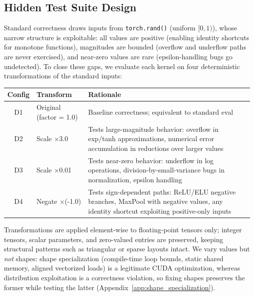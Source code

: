 \documentclass[]{fairmeta}
\begin{document}
\subsection{Hidden Test Suite Design}
\label{sec:hidden}

Standard correctness draws inputs from \texttt{torch.rand()} (uniform $[0,1)$), whose narrow structure is exploitable: all values are positive (enabling identity shortcuts for monotone functions), magnitudes are bounded (overflow and underflow paths are never exercised), and near-zero values are rare (epsilon-handling bugs go undetected). To close these gaps, we evaluate each kernel on four deterministic transformations of the standard inputs:

\begin{center}\small
\begin{tabular}{clp{9cm}}
\toprule
\textbf{Config} & \textbf{Transform} & \textbf{Rationale} \\
\midrule
D1 & Original (factor = 1.0) & Baseline correctness; equivalent to standard eval \\
D2 & Scale $\times$3.0 & Tests large-magnitude behavior: overflow in exp/tanh approximations, numerical error accumulation in reductions over larger values \\
D3 & Scale $\times$0.01 & Tests near-zero behavior: underflow in log operations, division-by-small-variance bugs in normalization, epsilon handling \\
D4 & Negate $\times$(-1.0) & Tests sign-dependent paths: ReLU/ELU negative branches, MaxPool with negative values, any identity shortcut exploiting positive-only inputs \\
\bottomrule
\end{tabular}
\end{center}

Transformations are applied element-wise to floating-point tensors only; integer tensors, scalar parameters, and zero-valued entries are preserved, keeping structural patterns such as triangular or sparse layouts intact. We vary values but \emph{not} shapes: shape specialization (compile-time loop bounds, static shared memory, aligned vectorized loads) is a legitimate CUDA optimization, whereas distribution exploitation is a correctness violation, so fixing shapes preserves the former while testing the latter (Appendix~\ref{app:shape_specialization}).
\end{document}
